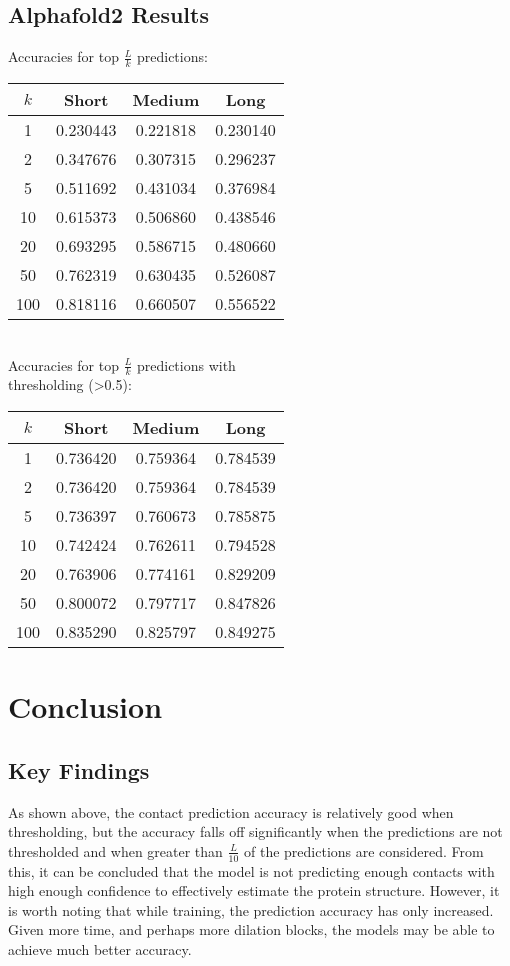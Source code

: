 \documentclass[11pt]{article}
\begin{document}
\begin{minipage}{0.45\textwidth}
\subsection{Alphafold2 Results}
Accuracies for top $\frac{L}{k}$ predictions:\\[4mm]
\begin{tabular}{c||c|c|c}
$k$ & Short & Medium & Long\\
\hline
1   & 0.230443 & 0.221818 & 0.230140\\
2   & 0.347676 & 0.307315 & 0.296237\\
5   & 0.511692 & 0.431034 & 0.376984\\
10  & 0.615373 & 0.506860 & 0.438546\\
20  & 0.693295 & 0.586715 & 0.480660\\
50  & 0.762319 & 0.630435 & 0.526087\\
100 & 0.818116 & 0.660507 & 0.556522
\end{tabular}\\[6mm]

Accuracies for top $\frac{L}{k}$ predictions with\\thresholding (>0.5):\\[4mm]
\begin{tabular}{c||c|c|c}
$k$ & Short & Medium & Long\\
\hline
1   & 0.736420 & 0.759364 & 0.784539\\
2   & 0.736420 & 0.759364 & 0.784539\\
5   & 0.736397 & 0.760673 & 0.785875\\
10  & 0.742424 & 0.762611 & 0.794528\\
20  & 0.763906 & 0.774161 & 0.829209\\
50  & 0.800072 & 0.797717 & 0.847826\\
100 & 0.835290 & 0.825797 & 0.849275
\end{tabular}
\end{minipage}

\section{Conclusion}
\subsection{Key Findings}
As shown above, the contact prediction accuracy is relatively good when thresholding, but the accuracy falls off significantly when the predictions are not thresholded and when greater than $\frac{L}{10}$ of the predictions are considered.  From this, it can be concluded that the model is not predicting enough contacts with high enough confidence to effectively estimate the protein structure.  However, it is worth noting that while training, the prediction accuracy has only increased.  Given more time, and perhaps more dilation blocks, the models may be able to achieve much better accuracy.
\end{document}
